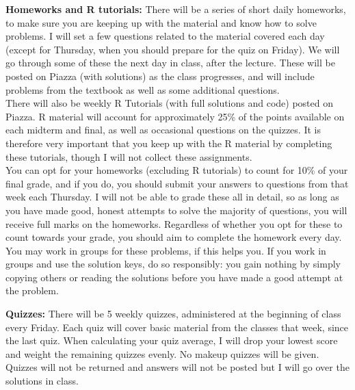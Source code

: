 \documentclass[11pt, letterpaper]{article}
\begin{document}
\medskip

\noindent \textbf{Homeworks and R tutorials:} There will be a series of short daily homeworks, to make sure
you are keeping up with the material and know how to solve problems. I will set a few questions
related to the material covered each day (except for Thursday, when you should prepare for the
quiz on Friday). We will go through some of these the next day in class, after the lecture. These
will be posted on Piazza (with solutions) as the class progresses, and will include problems from
the textbook as well as some additional questions.\\
\indent There will also be weekly R Tutorials (with full solutions and code) posted on Piazza. R material will account for approximately 25\% of the points available on each midterm and final, as well
as occasional questions on the quizzes. It is therefore very important that you keep up with the R material by completing these tutorials, though I will not collect these assignments.\\
\indent You can opt for your homeworks (excluding R tutorials) to count for 10\% of your final grade,
and if you do, you should submit your answers to questions from that week each Thursday. I will
not be able to grade these all in detail, so as long as you have made good, honest attempts to solve
the majority of questions, you will receive full marks on the homeworks. Regardless of whether you
opt for these to count towards your grade, you should aim to complete the homework every day.
You may work in groups for these problems, if this helps you. If you work in groups and use the solution keys, do so responsibly: you gain nothing by simply
copying others or reading the solutions before you have made a good attempt at the problem.\\

\medskip



\noindent \textbf{Quizzes:} There will be 5 weekly quizzes, administered at the beginning of class every Friday. Each
quiz will cover basic material from the classes that week, since the last quiz. When calculating your
quiz average, I will drop your lowest score and weight the remaining quizzes evenly. No makeup
quizzes will be given. Quizzes will not be returned and answers will not be posted but I will go
over the solutions in class.

\medskip
\end{document}
